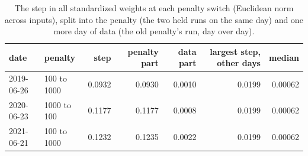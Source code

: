 \documentclass[10pt]{article}
\begin{document}
\begin{table}[h]\centering\small
\caption{The step in all standardized weights at each penalty switch (Euclidean norm across inputs), split into the penalty (the two held runs on the same day) and one more day of data (the old penalty's run, day over day).}
\begin{tabular}{llrrrrr}\toprule
date & penalty & step & penalty part & data part & largest step, other days & median \\\midrule
2019-06-26 & 100 to 1000 & 0.0932 & 0.0930 & 0.0010 & 0.0199 & 0.00062 \\
2020-06-23 & 1000 to 100 & 0.1177 & 0.1177 & 0.0008 & 0.0199 & 0.00062 \\
2021-06-21 & 100 to 1000 & 0.1232 & 0.1235 & 0.0022 & 0.0199 & 0.00062 \\
\bottomrule\end{tabular}\end{table}
\end{document}

